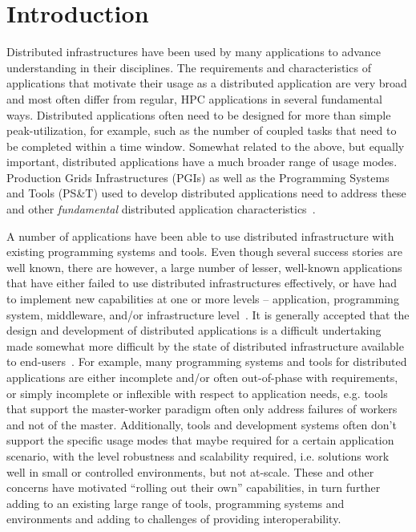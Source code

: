 \documentclass[conference,final]{IEEEtran}
\newcommand{\up}{\vspace*{-1em}}
\newcommand{\alnote}[1]{ {\textcolor{blue} { ***AL: #1 }}}
\newcommand{\alnote}[1]{}
\begin{document}
\up
\section{Introduction}
\up

Distributed infrastructures have been used by many applications to
advance understanding in their disciplines.  The requirements and
characteristics of applications that motivate their usage as a
distributed application are very broad and most often differ from
regular, HPC applications in several fundamental ways. Distributed
applications often need to be designed for more than simple
peak-utilization, for example, such as the number of coupled tasks
that need to be completed within a time window.  Somewhat related to
the above, but equally important, distributed applications have a much
broader range of usage modes.  Production Grids Infrastructures (PGIs)
as well as the Programming Systems and Tools (PS\&T) used to develop
distributed applications need to address these and other {\it fundamental}
distributed application characteristics~\cite{dpa-paper}.

A number of applications have been able to use distributed
infrastructure with existing programming systems and tools.
Even though several success stories are well known, there are however,
a large number of lesser, well-known applications that have either
failed to use distributed infrastructures effectively, or have had to
implement new capabilities at one or more levels -- application,
programming system, middleware, and/or infrastructure
level~\cite{dpa-paper,dpagrid2009}.  It is generally accepted that
the design and development of distributed applications is a difficult
undertaking made somewhat more difficult by the state of distributed
infrastructure available to end-users~\cite{dpagrid2009}.  For
example, many programming systems and tools for distributed
applications are either incomplete and/or often out-of-phase with
requirements, or simply incomplete or inflexible with respect to
application needs, e.g. tools that support the master-worker paradigm
often only address failures of workers and not of the master.
Additionally, tools and development systems often don't support the
specific usage modes that maybe required for a certain application
scenario, with the level robustness and scalability required, i.e.
solutions work well in small or controlled environments, but not
at-scale.  These and other concerns have motivated ``rolling out their
own'' capabilities, in turn further adding to an existing large range
of tools, programming systems and environments and adding to
challenges of providing
interoperability.  
\end{document}
